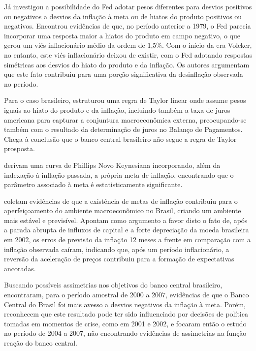 \documentclass[
	article,			%
	11pt,				%
	oneside,			%
	a4paper,			%
	english,			%
	brazil,				%
	]{abntex2}
\begin{document}
	Já  investigou a possibilidade do Fed adotar pesos diferentes para desvios positivos ou negativos a desvios da inflação à meta ou de hiatos do produto positivos ou negativos. Encontrou evidências de que, no período anterior a 1979, o Fed parecia incorporar uma resposta maior a hiatos do produto em campo negativo, o que gerou um viés inflacionário médio da ordem de 1,5\%. Com o início da era Volcker, no entanto, este viés inflacionário deixou de existir, com o Fed adotando respostas simétricas aos desvios do hiato do produto e da inflação. Os autores argumentam que este fato contribuiu para uma porção significativa da desinflação observada no período.
	
	Para o caso brasileiro,  estruturou uma regra de Taylor linear onde assume pesos iguais ao hiato do produto e da inflação, incluindo também a taxa de juros americana para capturar a conjuntura macroeconômica externa, preocupando-se também com o resultado da determinação de juros no Balanço de Pagamentos. Chega à conclusão que o banco central brasileiro não segue a regra de Taylor prosposta.
	
	 derivam uma curva de Phillips Novo Keynesiana incorporando, além da indexação à inflação passada, a própria meta de inflação, encontrando que o parâmetro associado à meta é estatisticamente significante.
	
	 coletam evidências de que a existência de metas de inflação contribuiu para o aperfeiçoamento do ambiente macroeconômico no Brasil, criando um ambiente mais estável e previsível. Apontam como argumento a favor disto o fato de, após a parada abrupta de influxos de capital e a forte depreciação da moeda brasileira em 2002, os erros de previsão da inflação 12 meses a frente em comparação com a inflação observada caíram, indicando que, após um período inflacionário, a reversão da aceleração de preços contribuiu para a formação de expectativas ancoradas.
	
	Buscando possíveis assimetrias nos objetivos do banco central brasileiro,  encontraram, para o período amostral de 2000 a 2007, evidências de que o Banco Central do Brasil foi mais avesso a desvios negativos da inflação à meta. Porém, reconhecem que este resultado pode ter sido influenciado por decisões de política tomadas em momentos de crise, como em 2001 e 2002, e focaram então o estudo no período de 2004 a 2007, não encontrando evidências de assimetrias na função reação do banco central.
	
\end{document}
